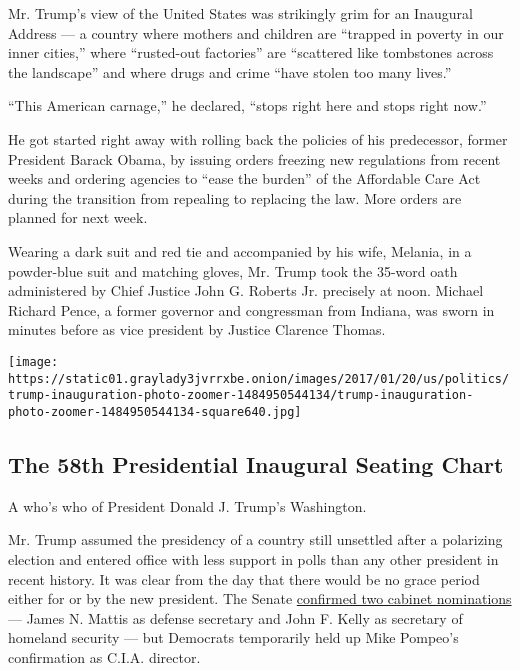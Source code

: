 Mr. Trump's view of the United States was strikingly grim for an
Inaugural Address --- a country where mothers and children are ``trapped
in poverty in our inner cities,'' where ``rusted-out factories'' are
``scattered like tombstones across the landscape'' and where drugs and
crime ``have stolen too many lives.''

``This American carnage,'' he declared, ``stops right here and stops
right now.''

He got started right away with rolling back the policies of his
predecessor, former President Barack Obama, by issuing orders freezing
new regulations from recent weeks and ordering agencies to ``ease the
burden'' of the Affordable Care Act during the transition from repealing
to replacing the law. More orders are planned for next week.

Wearing a dark suit and red tie and accompanied by his wife, Melania, in
a powder-blue suit and matching gloves, Mr. Trump took the 35-word oath
administered by Chief Justice John G. Roberts Jr. precisely at noon.
Michael Richard Pence, a former governor and congressman from Indiana,
was sworn in minutes before as vice president by Justice Clarence
Thomas.

\href{https://www.nytimes3xbfgragh.onion/interactive/2017/01/20/us/politics/trump-inauguration-photo-zoomer.html}{}

\texttt{[image: https://static01.graylady3jvrrxbe.onion/images/2017/01/20/us/politics/trump-inauguration-photo-zoomer-1484950544134/trump-inauguration-photo-zoomer-1484950544134-square640.jpg]}

\hypertarget{the-58th-presidential-inaugural-seating-chart}{%
\subsection{The 58th Presidential Inaugural Seating
Chart}\label{the-58th-presidential-inaugural-seating-chart}}

A who's who of President Donald J. Trump's Washington.

Mr. Trump assumed the presidency of a country still unsettled after a
polarizing election and entered office with less support in polls than
any other president in recent history. It was clear from the day that
there would be no grace period either for or by the new president. The
Senate
\href{https://www.nytimes3xbfgragh.onion/2017/01/20/us/politics/trump-cabinet-confirmation-mattis-kelly}{confirmed
two cabinet nominations} --- James N. Mattis as defense secretary and
John F. Kelly as secretary of homeland security --- but Democrats
temporarily held up Mike Pompeo's confirmation as C.I.A. director.

